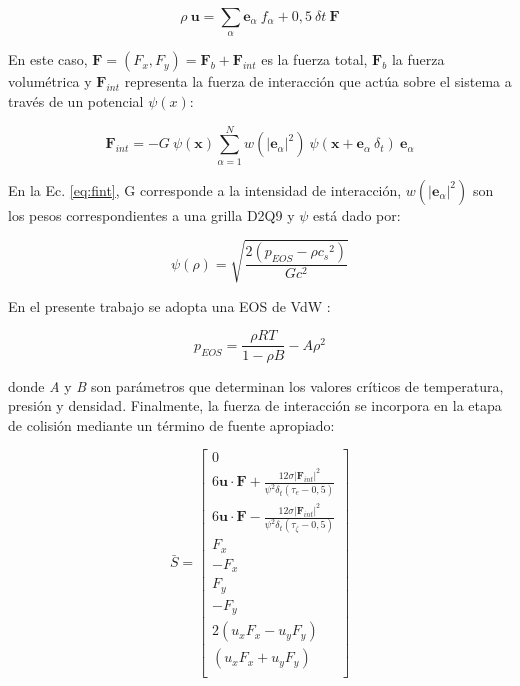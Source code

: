 \begin{equation}
    \rho \> \mathbf{u} = \sum_{\alpha} {\mathbf{e}}_{\alpha} \> f_{\alpha} + 0,5 \> {\delta}{t} \> \mathbf{F}
\end{equation}

En este caso, $ {\mathbf{F}} = (F_{x} , F_{y} ) = {\mathbf{F}}_{b} + {\mathbf{F}}_{int} $ es la fuerza total, ${\mathbf{F}}_{b}$ la fuerza volumétrica y ${\mathbf{F}}_{int}$ representa la fuerza de interacción que actúa sobre el sistema a través de un potencial $\psi(x)$:
    
\begin{equation}
    {\mathbf{F}}_{int} = - G \> \psi(\mathbf{x}) \sum_{\alpha=1}^{N} w({|{\mathbf{e}}_{\alpha}|}^{2}) \> \psi (\mathbf{x} + {\mathbf{e}}_{\alpha} \> \delta_{t}) \> {\mathbf{e}}_{\alpha} 
    \label{eq:fint}
\end{equation}

En la Ec. \ref{eq:fint}, G corresponde a la intensidad de interacción, $w({|{\mathbf{e}}_{\alpha}|}^{2})$ son los pesos correspondientes a una grilla D2Q9 y $\psi$ está dado por:

\begin{equation} 
    \psi(\rho) = \sqrt{\frac{2 (p_{EOS} - \rho {c_{s}}^{2})}{G {c}^{2}}}
\end{equation}

En el presente trabajo se adopta una EOS de VdW :

\begin{equation}
    p_{EOS} = \frac{\rho R T}{1- \rho B} - A {\rho}^{2}
\end{equation}

donde \textit{A} y \textit{B} son parámetros que determinan los valores críticos de temperatura, presión y densidad. Finalmente, la fuerza de interacción se incorpora en la etapa de colisión mediante un término de fuente apropiado:

\begin{equation}
    \bar{S} = 
    \left[ \begin{array}{c} 
        0\\
        6 \mathbf{u}\cdot \mathbf{F} + \frac{12 \sigma {|{\mathbf{F}_{int}|}}^{2} }{{\psi}^{2} \delta_{t} (\tau_{e} - 0,5)}\\
        6 \mathbf{u}\cdot \mathbf{F} - \frac{12 \sigma {|{\mathbf{F}_{int}|}}^{2} }{{\psi}^{2} \delta_{t} (\tau_{\zeta } - 0,5)}\\
        F_{x}\\
        -F_{x}\\
        F_{y}\\
        -F_{y}\\
        2(u_{x} F_{x} - u_{y} F_{y} )\\
        (u_{x} F_{x} + u_{y} F_{y} )\\              
    \end{array}
    \right]    
\end{equation}

